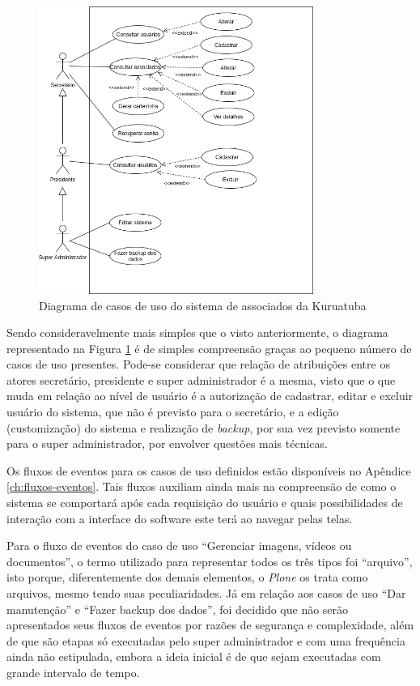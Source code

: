 \begin{figure}[htb]
 \centering
 \caption{Diagrama de casos de uso do sistema de associados da Kuruatuba}
 \includegraphics[width=0.8\textwidth]{figuras/use-case-sistema.png}
 
 \label{use-case-sistema}
\end{figure}

Sendo consideravelmente mais simples que o visto anteriormente, o diagrama representado na Figura \ref{use-case-sistema} é de simples compreensão graças ao pequeno número de casos de uso presentes. Pode-se considerar que relação de atribuições entre os atores secretário,  presidente e super administrador é a mesma, visto que o que muda em relação ao nível de usuário é a autorização de cadastrar, editar e excluir usuário do sistema, que não é previsto para o secretário, e a edição (customização) do sistema e realização de \textit{backup}, por sua vez previsto somente para o super administrador, por envolver questões mais técnicas.

Os fluxos de eventos para os casos de uso definidos estão disponíveis no Apêndice \ref{ch:fluxos-eventos}. Tais fluxos auxiliam ainda mais na compreensão de como o sistema se comportará após cada requisição do usuário e quais possibilidades de interação com a interface do software este terá ao navegar pelas telas. 

Para o fluxo de eventos do caso de uso ``Gerenciar imagens, vídeos ou documentos'', o termo utilizado para representar todos os três tipos foi ``arquivo'', isto porque, diferentemente dos demais elementos, o \textit{Plone} os trata como arquivos, mesmo tendo suas peculiaridades. Já em relação aos casos de uso ``Dar manutenção'' e ``Fazer backup dos dados'', foi decidido que não serão apresentados seus fluxos de eventos por razões de segurança e complexidade, além de que são etapas só executadas pelo super administrador e com uma frequência ainda não estipulada, embora a ideia inicial é de que sejam executadas com grande intervalo de tempo.


